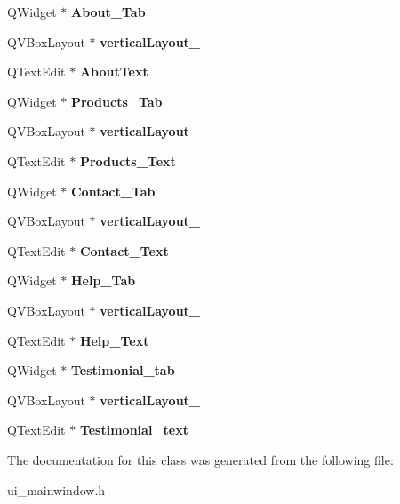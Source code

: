 \begin{DoxyCompactItemize}
\mbox{\label{class_ui___main_window_a9a38dca2c8fbd7461b6c95622ae019ee}} 
Q\+Widget $\ast$ {\bfseries About\+\_\+\+Tab}
\item 
\mbox{\label{class_ui___main_window_a0c01bad60d9f422a1258e710635a2f65}} 
Q\+V\+Box\+Layout $\ast$ {\bfseries vertical\+Layout\+\_}
\item 
\mbox{\label{class_ui___main_window_ad5ef4cdd2c4eda187fefd9f7d3509f0f}} 
Q\+Text\+Edit $\ast$ {\bfseries About\+Text}
\item 
\mbox{\label{class_ui___main_window_a3e01ea4c9236915ec78f2419665f3f54}} 
Q\+Widget $\ast$ {\bfseries Products\+\_\+\+Tab}
\item 
\mbox{\label{class_ui___main_window_aecd96a04789fcfec3f98d80390ad8184}} 
Q\+V\+Box\+Layout $\ast$ {\bfseries vertical\+Layout}
\item 
\mbox{\label{class_ui___main_window_aa7f054d0a81a0ee21957bcfcb197fcc4}} 
Q\+Text\+Edit $\ast$ {\bfseries Products\+\_\+\+Text}
\item 
\mbox{\label{class_ui___main_window_aca6d6f2f835be7759921122952cf5759}} 
Q\+Widget $\ast$ {\bfseries Contact\+\_\+\+Tab}
\item 
\mbox{\label{class_ui___main_window_a38b8a4b887f3b58e2a49e7905ae6f1f0}} 
Q\+V\+Box\+Layout $\ast$ {\bfseries vertical\+Layout\+\_}
\item 
\mbox{\label{class_ui___main_window_a89ec91f1ef3f58c196bbb87a28dd932e}} 
Q\+Text\+Edit $\ast$ {\bfseries Contact\+\_\+\+Text}
\item 
\mbox{\label{class_ui___main_window_a3ac436b950ced47372f61a0c97e8f662}} 
Q\+Widget $\ast$ {\bfseries Help\+\_\+\+Tab}
\item 
\mbox{\label{class_ui___main_window_a6f40fc110b15410c00837a446d57bdbe}} 
Q\+V\+Box\+Layout $\ast$ {\bfseries vertical\+Layout\+\_}
\item 
\mbox{\label{class_ui___main_window_ac1f4275f878e1f09ee4e82a7a21da359}} 
Q\+Text\+Edit $\ast$ {\bfseries Help\+\_\+\+Text}
\item 
\mbox{\label{class_ui___main_window_a82f8f308d774ebf187a3891a1e319444}} 
Q\+Widget $\ast$ {\bfseries Testimonial\+\_\+tab}
\item 
\mbox{\label{class_ui___main_window_a93c190b085c63a667c535ba0bbcfec7c}} 
Q\+V\+Box\+Layout $\ast$ {\bfseries vertical\+Layout\+\_}
\item 
\mbox{\label{class_ui___main_window_a0eb45063b494d4600ae2c69ee320795b}} 
Q\+Text\+Edit $\ast$ {\bfseries Testimonial\+\_\+text}
\end{DoxyCompactItemize}


The documentation for this class was generated from the following file\+:\begin{DoxyCompactItemize}
\item 
ui\+\_\+mainwindow.\+h\end{DoxyCompactItemize}
